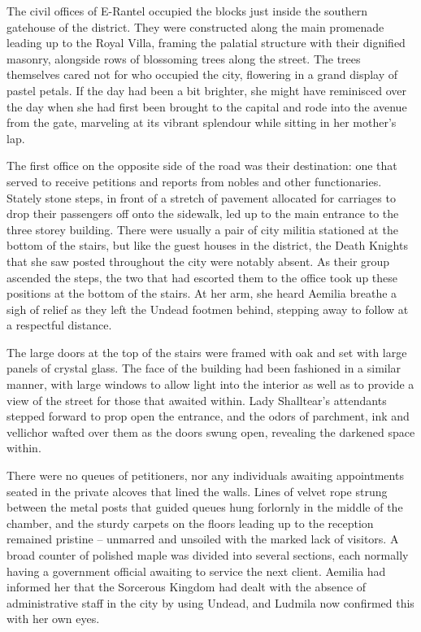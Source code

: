  

The civil offices of E-Rantel occupied the blocks just inside the southern gatehouse of the district. They were constructed along the main promenade leading up to the Royal Villa, framing the palatial structure with their dignified masonry, alongside rows of blossoming trees along the street. The trees themselves cared not for who occupied the city, flowering in a grand display of pastel petals. If the day had been a bit brighter, she might have reminisced over the day when she had first been brought to the capital and rode into the avenue from the gate, marveling at its vibrant splendour while sitting in her mother’s lap.

 

The first office on the opposite side of the road was their destination: one that served to receive petitions and reports from nobles and other functionaries. Stately stone steps, in front of a stretch of pavement allocated for carriages to drop their passengers off onto the sidewalk, led up to the main entrance to the three storey building. There were usually a pair of city militia stationed at the bottom of the stairs, but like the guest houses in the district, the Death Knights that she saw posted throughout the city were notably absent. As their group ascended the steps, the two that had escorted them to the office took up these positions at the bottom of the stairs. At her arm, she heard Aemilia breathe a sigh of relief as they left the Undead footmen behind, stepping away to follow at a respectful distance.

 

The large doors at the top of the stairs were framed with oak and set with large panels of crystal glass. The face of the building had been fashioned in a similar manner, with large windows to allow light into the interior as well as to provide a view of the street for those that awaited within. Lady Shalltear’s attendants stepped forward to prop open the entrance, and the odors of parchment, ink and vellichor wafted over them as the doors swung open, revealing the darkened space within.

 

There were no queues of petitioners, nor any individuals awaiting appointments seated in the private alcoves that lined the walls. Lines of velvet rope strung between the metal posts that guided queues hung forlornly in the middle of the chamber, and the sturdy carpets on the floors leading up to the reception remained pristine – unmarred and unsoiled with the marked lack of visitors. A broad counter of polished maple was divided into several sections, each normally having a government official awaiting to service the next client. Aemilia had informed her that the Sorcerous Kingdom had dealt with the absence of administrative staff in the city by using Undead, and Ludmila now confirmed this with her own eyes.

